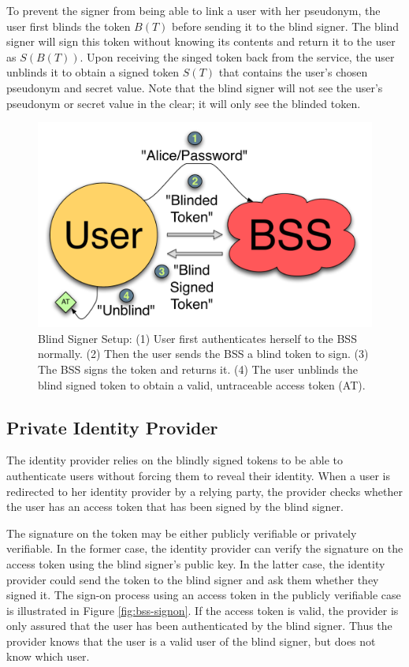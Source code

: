 \documentclass{llncs}
\begin{document}
To prevent the signer from being able to link a user with her
pseudonym, the user first blinds the token $B(T)$ before sending it to
the blind signer. The blind signer will sign this token without
knowing its contents and return it to the user as $S(B(T))$. Upon
receiving the singed token back from the service, the user unblinds it
to obtain a signed token $S(T)$ that contains the user's chosen
pseudonym and secret value. Note that the blind signer will not see
the user's pseudonym or secret value in the clear; it will only see
the blinded token.

\begin{figure}
  \centering
  \includegraphics[scale=0.6]{figs/fig-bss-setup-color.pdf}
  \caption{Blind Signer Setup: (1) User first authenticates herself to
    the BSS normally. (2) Then the user sends the BSS a blind token to
    sign. (3) The BSS signs the token and returns it. (4) The user
    unblinds the blind signed token to obtain a valid, untraceable
    access token (AT).}
  \label{fig:bss-setup}
\end{figure}

\subsection{Private Identity Provider}

The identity provider relies on the blindly signed tokens to be able
to authenticate users without forcing them to reveal their
identity. When a user is redirected to her identity provider by a
relying party, the provider checks whether the user has an access
token that has been signed by the blind signer.

The signature on the token may be either publicly verifiable or
privately verifiable. In the former case, the identity provider can
verify the signature on the access token using the blind signer's
public key. In the latter case, the identity provider could send the
token to the blind signer and ask them whether they signed it. The
sign-on process using an access token in the publicly verifiable case
is illustrated in Figure \ref{fig:bss-signon}. If the access token is
valid, the provider is only assured that the user has been
authenticated by the blind signer. Thus the provider knows that the
user is a valid user of the blind signer, but does not know which
user.
\end{document}

